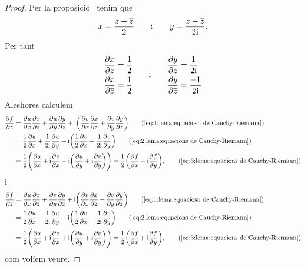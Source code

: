 \documentclass[../Apunts.tex]{subfiles}
\begin{document}
	\begin{proof}
		Per la proposició~ tenim que
		\[x=\frac{z+\overline{z}}{2}\qquad\text{i}\qquad y=\frac{z-\overline{z}}{2\mathrm{i}}.\]
		Per tant
		\begin{gather}
			\label{eq:2:lema:equacions de Cauchy-Riemann}
			\begin{split}
				\frac{\partial x}{\partial z}&=\frac{1}{2}\\
				\frac{\partial x}{\partial\overline{z}}&=\frac{1}{2}
			\end{split}\qquad\text{i}\qquad
			\begin{split}
				\frac{\partial y}{\partial z}&=\frac{1}{2\mathrm{i}}\\
				\frac{\partial y}{\partial\overline{z}}&=\frac{-1}{2\mathrm{i}}
			\end{split}
		\end{gather}
		Aleshores calculem
		\begin{align*}
			\frac{\partial f}{\partial z}&=\frac{\partial u}{\partial x}\frac{\partial x}{\partial z}+\frac{\partial u}{\partial y}\frac{\partial y}{\partial z}+\iu\biggl(\frac{\partial v}{\partial x}\frac{\partial x}{\partial z}+\frac{\partial v}{\partial y}\frac{\partial y}{\partial z}\biggr) \tag{\ref{eq:1:lema:equaciosn de Cauchy-Riemann}}\\
			&=\frac{1}{2}\frac{\partial u}{\partial x}+\frac{1}{2\iu}\frac{\partial u}{\partial y}+\iu\biggl(\frac{1}{2}\frac{\partial v}{\partial x}+\frac{1}{2\iu}\frac{\partial v}{\partial y}\biggr) \tag{\ref{eq:2:lema:equacions de Cauchy-Riemann}}\\
			&=\frac{1}{2}\Biggl(\frac{\partial u}{\partial x}+\iu\frac{\partial v}{\partial x}-\iu\biggl(\frac{\partial u}{\partial y}+\iu\frac{\partial v}{\partial y}\biggr)\Biggr)=\frac{1}{2}\biggl(\frac{\partial f}{\partial x}-\iu\frac{\partial f}{\partial y	}\biggr), \tag{\ref{eq:3:lema:equacions de Cauchy-Riemann}}
		\end{align*}
		i
		\begin{align*}
			\frac{\partial f}{\partial\conjugat{z}}&=\frac{\partial u}{\partial x}\frac{\partial x}{\partial\conjugat{z}}+\frac{\partial v}{\partial y}\frac{\partial y}{\partial\conjugat{z}}+\iu\biggl(\frac{\partial v}{\partial x}\frac{\partial x}{\partial\conjugat{z}}+\frac{\partial v}{\partial y}\frac{\partial y}{\partial\conjugat{z}}\biggr)  \tag{\ref{eq:1:lema:equaciosn de Cauchy-Riemann}}\\
			&=\frac{1}{2}\frac{\partial u}{\partial x}-\frac{1}{2\iu}\frac{\partial u}{\partial y}+\iu\biggl(\frac{1}{2}\frac{\partial v}{\partial x}-\frac{1}{2\iu}\frac{\partial v}{\partial y}\biggr) \tag{\ref{eq:2:lema:equacions de Cauchy-Riemann}}\\
			&=\frac{1}{2}\Biggl(\frac{\partial u}{\partial x}+\iu\frac{\partial v}{\partial x}+\iu\biggl(\frac{\partial u}{\partial y}+\iu\frac{\partial v}{\partial y}\biggr)\Biggr)=\frac{1}{2}\biggl(\frac{\partial f}{\partial x}+\iu\frac{\partial f}{\partial y}\biggr), \tag{\ref{eq:3:lema:equacions de Cauchy-Riemann}}
		\end{align*}
		com volíem veure.
	\end{proof}
\end{document}
